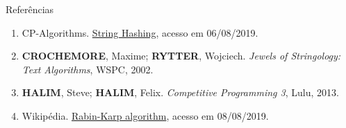 \begin{frame}[fragile]{Referências}

    \begin{enumerate}
        \item CP-Algorithms. \href{https://cp-algorithms.com/string/string-hashing.html}{String Hashing}, acesso em 06/08/2019.

        \item \textbf{CROCHEMORE}, Maxime; \textbf{RYTTER}, Wojciech. \textit{Jewels of Stringology: Text Algorithms}, WSPC, 2002.

        \item \textbf{HALIM}, Steve; \textbf{HALIM}, Felix. \textit{Competitive Programming 3}, Lulu, 2013.

        \item Wikipédia. \href{https://en.wikipedia.org/wiki/Rabin\%E2\%80\%93Karp_algorithm}{Rabin-Karp algorithm}, acesso em 08/08/2019.

    \end{enumerate}

\end{frame}
